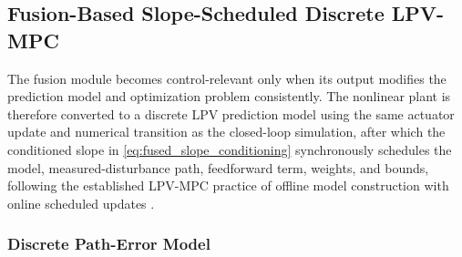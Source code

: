 \documentclass{ieeeaccess}
\newcommand{\citep}[1]{\cite{#1}}
\begin{document}
\subsection{Fusion-Based Slope-Scheduled Discrete LPV-MPC}
\label{sec:model_lpv_mpc}

The fusion module becomes control-relevant only when its output modifies the prediction model and optimization problem consistently. The nonlinear plant is therefore converted to a discrete LPV prediction model using the same actuator update and numerical transition as the closed-loop simulation, after which the conditioned slope in \eqref{eq:fused_slope_conditioning} synchronously schedules the model, measured-disturbance path, feedforward term, weights, and bounds, following the established LPV-MPC practice of offline model construction with online scheduled updates \citep{Uchihori2021AUVLPVMPC}.

\subsubsection{Discrete Path-Error Model}
\end{document}

